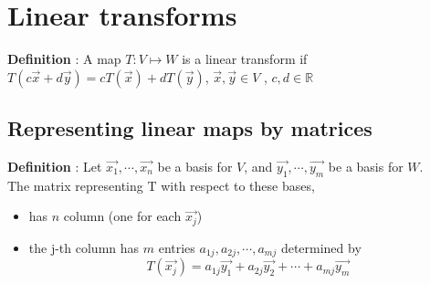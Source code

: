\documentclass{article}
\begin{document}
\section{Linear transforms}
{
\textbf{Definition} : A map $T: V \mapsto W$ is a linear transform if \\
$T(c\vec{x}+d\vec{y}) = cT(\vec{x})+dT(\vec{y})$, $\vec{x},\vec{y} \in V$ , $c,d \in \mathbb{R}$
}

\subsection{Representing linear maps by matrices}
{
\textbf{Definition} : Let $\vec{x_1}, \cdots , \vec{x_n}$ be a basis for $V$, and $\vec{y_1}, \cdots , \vec{y_m}$ be a basis for $W$.\\
The matrix representing T with respect to these bases,
\begin{itemize}
    \item has $n$ column (one for each $\vec{x_j}$)
    \item the j-th column has $m$ entries $a_{1j},a_{2j}, \cdots , a_{mj}$ determined by
    \[
    T(\vec{x_j}) = a_{1j}\vec{y_1} + a_{2j}\vec{y_2} + \cdots + a_{mj}\vec{y_m}
    \]
\end{itemize}

}
\end{document}
